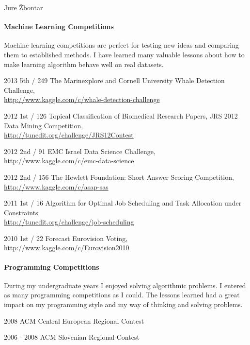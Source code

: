 \documentclass[12pt,a4paper]{article}
\begin{document}
\begin{cv}{Jure \v{Z}bontar}
\paragraph{Machine Learning Competitions}
Machine learning competitions are perfect for testing new ideas and comparing
them to established methods. I have learned many valuable lessons about how to
make learning algorithm behave well on real datasets.

\begin{cvlist}{}
\item[2013 \quad 5th / 249] The Marinexplore and Cornell University Whale Detection 
Challenge, \\
\url{http://www.kaggle.com/c/whale-detection-challenge}
\item[2012 \quad 1st / 126] Topical Classification of Biomedical Research Papers, 
JRS 2012 Data Mining Competition, \\
\url{http://tunedit.org/challenge/JRS12Contest}
\item[2012 \quad 2nd / 91] EMC Israel Data Science Challenge, \\
\url{http://www.kaggle.com/c/emc-data-science}
\item[2012 \quad 2nd / 156] The Hewlett Foundation: Short Answer Scoring 
Competition, \\
\url{http://www.kaggle.com/c/asap-sas}
\item[2011 \quad 1st / 16] Algorithm for Optimal Job Scheduling and Task 
Allocation under Constraints \\
\url{http://tunedit.org/challenge/job-scheduling}
\item[2010 \quad 1st / 22] Forecast Eurovision Voting, \\
\url{http://www.kaggle.com/c/Eurovision2010}
\end{cvlist}

\paragraph*{Programming Competitions}
During my undergraduate years I enjoyed solving algorithmic problems. I entered
as many programming competitions as I could. The lessons learned had a great
impact on my programming style and my way of thinking and solving problems.

\begin{cvlist}{}
\item[2008] ACM Central European Regional Contest
\item[2006 - 2008] ACM Slovenian Regional Contest
\end{cvlist}


\end{cv}
\end{document}
